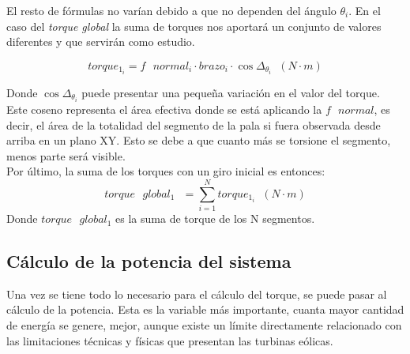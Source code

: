 El resto de fórmulas no varían debido a que no dependen del ángulo $\theta_i$. En el caso del \textit{torque global} la suma de torques nos aportará un conjunto de valores diferentes y que servirán como estudio.

  \begin{equation}
  torque_{1_i} = f \text{ } normal_i \cdot brazo_i \cdot \cos{\Delta_{\theta_{i}}} \hspace{7pt} (N \cdot m)
 \label{def:torque_algebraico_torsion}
 \end{equation}
 
Donde $ \cos{\Delta_{\theta_{i}}} $ puede presentar una pequeña variación en el valor del torque. Este coseno representa el área efectiva donde se está aplicando la $ f \text{ } normal $, es decir, el área de la totalidad del segmento de la pala si fuera observada desde arriba en un plano XY. Esto se debe a que cuanto más se torsione el segmento, menos parte será visible.\\

Por último, la suma de los torques con un giro inicial es entonces:
\begin{equation}
  torque \text{ } global_1 \text{ } = \sum_{i=1}^{N} torque_{1_i} \hspace{7pt} (N \cdot m)
 \label{def:torque_global_1}
\end{equation}
Donde $torque \text{ } global_1$ es la suma de torque de los N segmentos.





















\subsection{Cálculo de la potencia del sistema}
\label{section:pot_sistema}
 
 Una vez se tiene todo lo necesario para el cálculo del torque, se puede pasar al cálculo de la potencia. Esta es la variable más importante, cuanta mayor cantidad de energía se genere, mejor, aunque existe un límite directamente relacionado con las limitaciones técnicas y físicas que presentan las turbinas eólicas. \\
 
